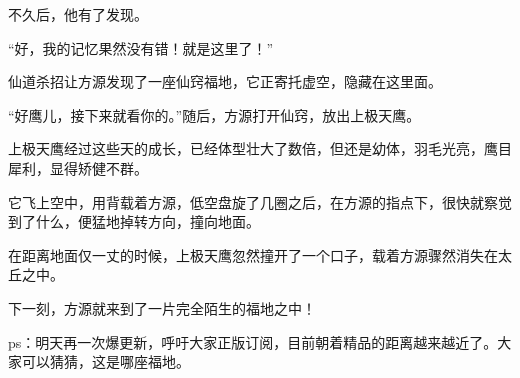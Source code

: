 \begin{this_body}
不久后，他有了发现。

“好，我的记忆果然没有错！就是这里了！”

仙道杀招让方源发现了一座仙窍福地，它正寄托虚空，隐藏在这里面。

“好鹰儿，接下来就看你的。”随后，方源打开仙窍，放出上极天鹰。

上极天鹰经过这些天的成长，已经体型壮大了数倍，但还是幼体，羽毛光亮，鹰目犀利，显得矫健不群。

它飞上空中，用背载着方源，低空盘旋了几圈之后，在方源的指点下，很快就察觉到了什么，便猛地掉转方向，撞向地面。

在距离地面仅一丈的时候，上极天鹰忽然撞开了一个口子，载着方源骤然消失在太丘之中。

下一刻，方源就来到了一片完全陌生的福地之中！

ps：明天再一次爆更新，呼吁大家正版订阅，目前朝着精品的距离越来越近了。大家可以猜猜，这是哪座福地。

\end{this_body}


